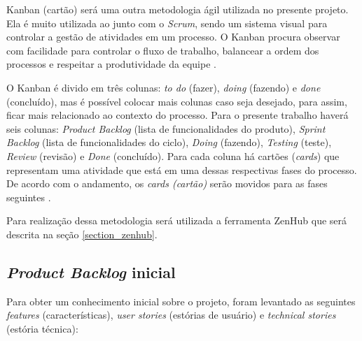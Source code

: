 Kanban (cartão) será uma outra metodologia ágil utilizada no presente projeto. Ela é muito utilizada ao junto com o \textit{Scrum}, sendo um sistema visual para controlar a gestão de atividades em um processo. O Kanban procura observar com facilidade para controlar o fluxo de trabalho, balancear a ordem dos processos e respeitar a produtividade da equipe \cite{ARTIA:2019}.

O Kanban é divido em três colunas: \textit{to do} (fazer), \textit{doing} (fazendo) e \textit{done} (concluído), mas é possível colocar mais colunas caso seja desejado, para assim, ficar mais relacionado ao contexto do processo. Para o presente trabalho haverá seis colunas: \textit{Product Backlog} (lista de funcionalidades do produto), \textit{Sprint Backlog} (lista de funcionalidades do ciclo), \textit{Doing} (fazendo), \textit{Testing} (teste), \textit{Review} (revisão) e \textit{Done} (concluído). Para cada coluna há cartões (\textit{cards}) que representam uma atividade que está em uma dessas respectivas fases do processo. De acordo com o andamento, os \textit{cards (cartão)} serão movidos para as fases seguintes \cite{ARTIA:2019}.

Para realização dessa metodologia será utilizada a ferramenta ZenHub que será descrita na seção \ref{section_zenhub}.

\subsection{\textit{Product Backlog} inicial}
\label{section_product_backlog}

Para obter um conhecimento inicial sobre o projeto, foram levantado as seguintes \textit{features} (características), \textit{user stories} (estórias de usuário) e \textit{technical stories} (estória técnica):

